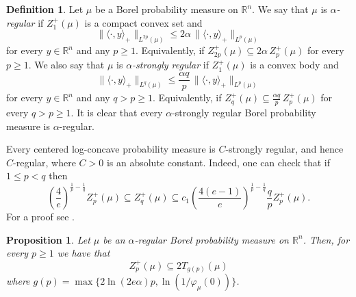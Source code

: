 \documentclass[11pt,leqno]{article}
\newtheorem{proposition}[theorem]{Proposition}
\theoremstyle{definition}
\newtheorem{definition}[theorem]{Definition}
\theoremstyle{remark}
\numberwithin{equation}{section}
\newcommand{\ls}{\leqslant}
\newcommand{\gr}{\geqslant}
\newcommand{\1}{\textbf{1}}
\begin{document}
\begin{definition}\label{def:Z}\rm Let $\mu$ be a Borel probability measure on $\mathbb{R}^n$. We say that
$\mu$ is {\it $\alpha $-regular} if $Z_1^+(\mu)$ is a compact convex set and
$$\|\langle \cdot,y\rangle_+\|_{L^{2p}(\mu)}
\ls 2\alpha \,\|\langle \cdot ,y\rangle_+\|_{L^{p}(\mu)}$$
for every $y\in\mathbb{R}^n$ and any $p\gr 1$. Equivalently, if $Z_{2p}^+(\mu)\subseteq 2\alpha \,Z_p^+(\mu)$
for every $p\gr 1$. We also say that $\mu$ is {\it $\alpha $-strongly regular} if $Z_1^+(\mu)$ is a convex body and
$$\|\langle \cdot ,y\rangle_+\|_{L^{q}(\mu)}
\ls \frac{\alpha q}{p}\,\|\langle \cdot ,y\rangle_+\|_{L^{p}(\mu)}$$
for every $y\in\mathbb{R}^n$ and any $q>p\gr 1$. Equivalently, if $Z_q^+(\mu)\subseteq \frac{\alpha q}{p}\,Z_p^+(\mu)$
for every $q>p\gr 1$. It is clear that every $\alpha $-strongly regular
Borel probability measure is $\alpha $-regular.

Every centered log-concave probability measure is $C$-strongly regular,
and hence $C$-regular, where $C>0$ is an absolute constant. Indeed, one can check that if $1\ls p<q$ then
\begin{equation}\label{eq:regularity}\left(\frac{4}{e}\right)^{\frac{1}{p}-\frac{1}{q}}Z_p^+(\mu )\subseteq Z_q^+(\mu )
\subseteq c_1\left(\frac{4(e-1)}{e}\right)^{\frac{1}{p}-\frac{1}{q}}\frac{q}{p}Z_p^+(\mu ).\end{equation}
For a proof see \cite{Guedon-EMilman-2011}.
\end{definition}

\begin{proposition}\label{prop:measure-1}Let $\mu$ be an $\alpha$-regular Borel probability measure on $\mathbb{R}^n$.
Then, for every $p\gr 1$ we have that
$$Z_p^+(\mu)\subseteq 2T_{g(p)}(\mu)$$
where $g(p)=\max\{2\ln(2e\alpha )p,\ln(1/\varphi_{\mu}(0))\}$.
\end{proposition}
\end{document}
